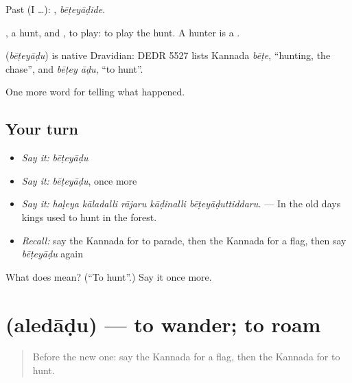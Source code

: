Past (I …): , \emph{bēṭeyāḍide}.

, a hunt, and , to play: to play the hunt. A hunter is a .

\begin{cousinweb}
\textbf{} (\emph{bēṭeyāḍu}) is native Dravidian: DEDR 5527 lists Kannada \emph{bēṭe}, \textquotedblleft{}hunting, the chase\textquotedblright{}, and \emph{bēṭey āḍu}, \textquotedblleft{}to hunt\textquotedblright{}.
\end{cousinweb}

\begin{grammarlens}[title={What you've built}]
One more word for telling what happened.
\end{grammarlens}

\subsection*{Your turn}
\begin{itemize}
\raggedright
  \item \emph{Say it:} \emph{bēṭeyāḍu}
  \item \emph{Say it:} \emph{bēṭeyāḍu}, once more
  \item \emph{Say it:} \emph{haḷeya kāladalli rājaru kāḍinalli bēṭeyāḍuttiddaru.} — In the old days kings used to hunt in the forest.
  \item \emph{Recall:} say the Kannada for to parade, then the Kannada for a flag, then say \emph{bēṭeyāḍu} again
\end{itemize}

\begin{tcolorbox}[breakable,colback=teal!4,colframe=teal!35!black,title={Before you move on}]
What does  mean? (\textquotedblleft{}To hunt\textquotedblright{}.) Say it once more.
\end{tcolorbox}
\section[\texorpdfstring{\kn{ಅಲೆದಾಡು} (aledāḍu)}{ಅಲೆದಾಡು (aledāḍu)}]{ (aledāḍu) — to wander; to roam}

\label{lesson:KA-C360-aledadu}



\begin{quote}
Before the new one: say the Kannada for a flag, then the Kannada for to hunt.
\end{quote}

